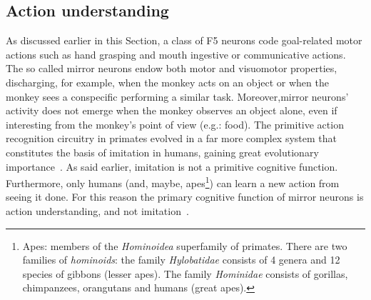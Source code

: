 \subsection{Action understanding}
\label{sec:actions:understanding}
As discussed earlier in this Section, a class of F5 neurons code goal-related
motor actions such as hand grasping and mouth ingestive or communicative
actions.
The so called mirror neurons endow both motor and visuomotor properties,
discharging, for example, when the monkey acts on an object or when the monkey
sees a conspecific performing a similar task.
Moreover,mirror neurons' activity does not emerge
when the monkey observes an object alone, even if interesting from the 
monkey's point of view (e.g.: food).
The primitive action recognition circuitry in primates evolved in a far more 
complex system that constitutes the basis of imitation in humans, gaining great
evolutionary importance~\citep{rizzolatti.etal:2001,jannerod:2004}.
As said earlier, imitation is not a primitive cognitive
function. Furthermore, only humans (and, maybe,
apes\footnote{Apes: members of the \emph{Hominoidea} superfamily of
primates. There are two families of \emph{hominoids}: the family 
\emph{Hylobatidae} consists of 4 genera and 12 species of gibbons 
(lesser apes). The family \emph{Hominidae} consists of gorillas, chimpanzees, 
orangutans and humans (great apes).}) can learn a new action
from seeing it done.
For this reason the primary cognitive function of mirror neurons is action
understanding, and not
imitation~\citep{rizzolatti.etal:2001,rizzolatti.craighero:2004}.


